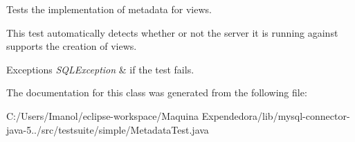 Tests the implementation of metadata for views.

This test automatically detects whether or not the server it is running against supports the creation of views.


\begin{DoxyExceptions}{Exceptions}
{\em S\+Q\+L\+Exception} & if the test fails. \\
\hline
\end{DoxyExceptions}


The documentation for this class was generated from the following file\+:\begin{DoxyCompactItemize}
\item 
C\+:/\+Users/\+Imanol/eclipse-\/workspace/\+Maquina Expendedora/lib/mysql-\/connector-\/java-\/5../src/testsuite/simple/Metadata\+Test.\+java\end{DoxyCompactItemize}
